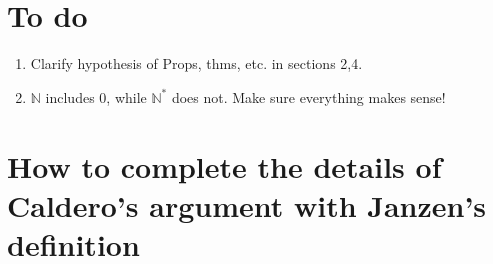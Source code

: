\documentclass[11pt,fleqn]{article}
\newcommand\NN{\mathbb N}
\begin{document}
\newpage
\section*{To do}
\begin{enumerate}
\item Clarify hypothesis of Props, thms, etc. in sections 2,4.

\item $\NN$ includes $0$, while $\NN^*$ does not. Make sure everything makes sense!
\end{enumerate}

\newpage
\section{How to complete the details of Caldero's argument with
Janzen's definition}
\end{document}
